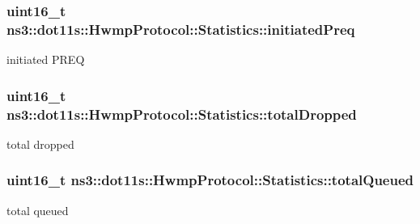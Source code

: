 \subsubsection[{\texorpdfstring{initiated\+Preq}{initiatedPreq}}]{\setlength{\rightskip}{0pt plus 5cm}uint16\+\_\+t ns3\+::dot11s\+::\+Hwmp\+Protocol\+::\+Statistics\+::initiated\+Preq}\hypertarget{structns3_1_1dot11s_1_1HwmpProtocol_1_1Statistics_ae6bc34aa4c7963585fdd71ef98f8d6b5}{}\label{structns3_1_1dot11s_1_1HwmpProtocol_1_1Statistics_ae6bc34aa4c7963585fdd71ef98f8d6b5}


initiated P\+R\+EQ 

\subsubsection[{\texorpdfstring{total\+Dropped}{totalDropped}}]{\setlength{\rightskip}{0pt plus 5cm}uint16\+\_\+t ns3\+::dot11s\+::\+Hwmp\+Protocol\+::\+Statistics\+::total\+Dropped}\hypertarget{structns3_1_1dot11s_1_1HwmpProtocol_1_1Statistics_a10f7af4034c326fc11df2942321e36f2}{}\label{structns3_1_1dot11s_1_1HwmpProtocol_1_1Statistics_a10f7af4034c326fc11df2942321e36f2}


total dropped 

\subsubsection[{\texorpdfstring{total\+Queued}{totalQueued}}]{\setlength{\rightskip}{0pt plus 5cm}uint16\+\_\+t ns3\+::dot11s\+::\+Hwmp\+Protocol\+::\+Statistics\+::total\+Queued}\hypertarget{structns3_1_1dot11s_1_1HwmpProtocol_1_1Statistics_a23f321f49ba13d78a633fd374383378b}{}\label{structns3_1_1dot11s_1_1HwmpProtocol_1_1Statistics_a23f321f49ba13d78a633fd374383378b}


total queued 

